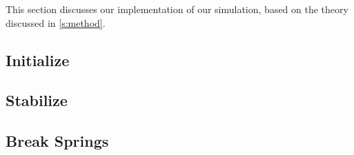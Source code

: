 This section discusses our implementation of our simulation, based on the theory discussed in \cref{s:method}. 

\subsection{Initialize}

\subsection{Stabilize}

\subsection{Break Springs}
